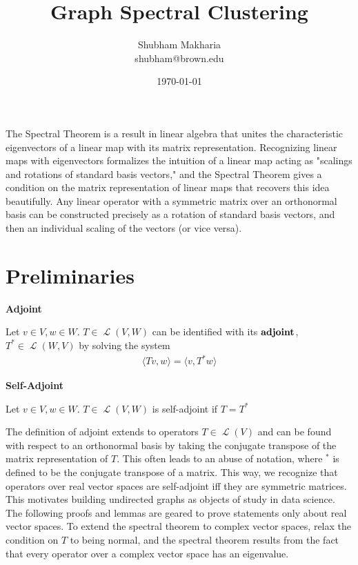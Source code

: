 \documentclass[letterpaper,12pt]{article}
\newcommand{\langlerangle}[1]{\langle{#1}\rangle}
\newcommand{\linearoperator}[1]{\operatorname{\mathcal{L}}(#1)}
\begin{document}
\title{Graph Spectral Clustering}
\author{Shubham Makharia \\shubham@brown.edu}
\date{\today}
\maketitle
The Spectral Theorem is a result in linear algebra that unites the characteristic eigenvectors of a linear map with its matrix representation. Recognizing linear maps with eigenvectors formalizes the intuition of a linear map acting as "scalings and rotations of standard basis vectors," and the Spectral Theorem gives a condition on the matrix representation of linear maps that recovers this idea beautifully. Any linear operator with a symmetric matrix over an orthonormal basis can be constructed precisely as a rotation of standard basis vectors, and then an individual scaling of the vectors (or vice versa). 

\section*{Preliminaries}

\noindent
\textbf{Adjoint}

\noindent
Let $v \in V, w \in W$. $T \in \linearoperator{V,W}$ can be identified with its $\bf{adjoint}$, $T^* \in \linearoperator{W,V}$ by solving the system
\begin{align}
    \langlerangle{Tv,w}=\langlerangle{v,T^{*}w}
\end{align}

\noindent
\textbf{Self-Adjoint}

\noindent
Let $v \in V, w \in W$. $T \in \linearoperator{V,W}$ is self-adjoint if $ T=T^*$


\noindent The definition of adjoint extends to operators $T \in \linearoperator{V}$ and can be found with respect to an orthonormal basis by taking the conjugate transpose of the matrix representation of $T$. This often leads to an abuse of notation, where $^{*}$ is defined to be the conjugate transpose of a matrix. This way, we recognize that operators over real vector spaces are self-adjoint iff they are symmetric matrices. This motivates building undirected graphs as objects of study in data science. The following proofs and lemmas are geared to prove statements only about real vector spaces. To extend the spectral theorem to complex vector spaces, relax the condition on $T$ to being normal, and the spectral theorem results from the fact that every operator over a complex vector space has an eigenvalue.
\end{document}
